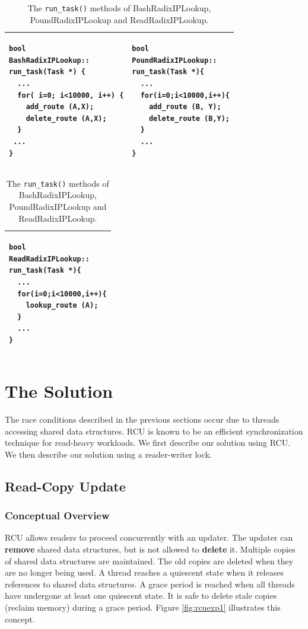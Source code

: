 \documentclass[a4paper]{article}
\begin{document}
\begin{table}[float=tph]
\begin{center}
\begin{tabular}{|p{2.2in}|p{2.2in}|}
\hline
\begin{lstlisting}[label=lst:uubashradixiplookup]
bool
BashRadixIPLookup::
run_task(Task *) {
  ...
  for( i=0; i<10000, i++) {
    add_route (A,X);
    delete_route (A,X);
  }
 ...
}
\end{lstlisting}
&
\begin{lstlisting}
bool
PoundRadixIPLookup::
run_task(Task *){
  ...
  for(i=0;i<10000,i++){
    add_route (B, Y);
    delete_route (B,Y);
  }
  ...
}
\end{lstlisting}\\
\hline
\end{tabular}
\begin{tabular}{|p{4.55in}|}
\begin{lstlisting}
bool
ReadRadixIPLookup::
run_task(Task *){
  ...
  for(i=0;i<10000,i++){
    lookup_route (A);
  }
  ...
}
\end{lstlisting}\\
\hline
\end{tabular}
\end{center}
\caption{The \texttt{run\_task()} methods of BashRadixIPLookup, PoundRadixIPLookup and ReadRadixIPLookup.}
\label{tbl:ruverify}
\end{table}


\pagebreak
\section{The Solution}
\label{sec:solution}
The race conditions described in the previous sections occur due to threads accessing shared data structures. RCU is known to be an efficient synchronization technique for read-heavy workloads. We first describe our solution using RCU. We then describe our solution using a reader-writer lock.

\subsection{Read-Copy Update}

\label{sec:rcu}


\subsubsection{Conceptual Overview}
RCU allows readers to proceed concurrently with an updater. The updater can \textbf{remove} shared data structures, but is not allowed to \textbf{delete} it. Multiple copies of shared data structures are maintained. The old copies are deleted when they are no longer being used. A thread reaches a quiescent state when it releases references to shared data structures. A grace period is reached when all threads have undergone at least one quiescent state. It is safe to delete stale copies (reclaim memory) during a grace period. Figure \ref{fig:rcuexp1} illustrates this concept.
\end{document}
